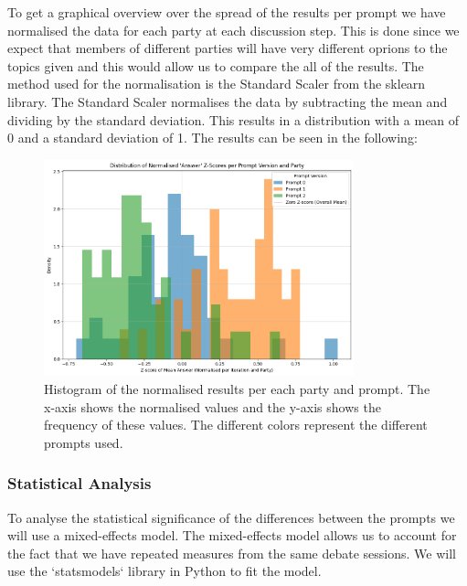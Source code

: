 \documentclass[12pt]{article}
\begin{document}
To get a graphical overview over the spread of the results per prompt we have normalised the data for each party at each discussion step. This is done since we expect that members of different parties will have very different oprions to the topics given and this would allow us to compare the all of the results. The method used for the normalisation is the Standard Scaler from the sklearn library. The Standard Scaler normalises the data by subtracting the mean and dividing by the standard deviation. This results in a distribution with a mean of 0 and a standard deviation of 1. The results can be seen in the following: 

\begin{figure}[h!]
\centering
\includegraphics[width=0.8\textwidth]{img/normalised_results.png}
\caption{Histogram of the normalised results per each party and prompt. The x-axis shows the normalised values and the y-axis shows the frequency of these values. The different colors represent the different prompts used.}
\label{fig:normalised_results}
\end{figure}


\subsubsection{Statistical Analysis}

To analyse the statistical significance of the differences between the prompts we will use a mixed-effects model. The mixed-effects model allows us to account for the fact that we have repeated measures from the same debate sessions. We will use the `statsmodels` library in Python to fit the model.
\end{document}
